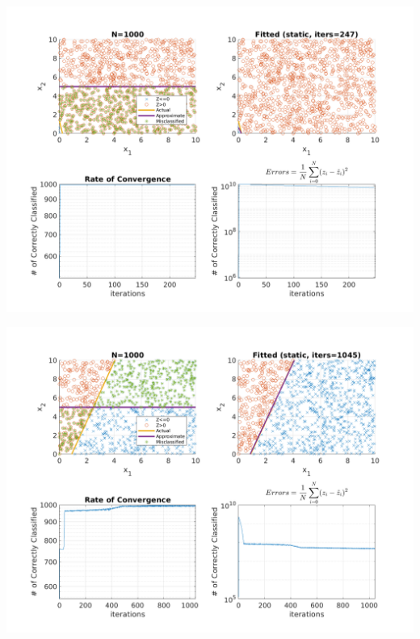 \documentclass{article}
\newenvironment{Figure}
  {\par\medskip\noindent\minipage{\linewidth}}
  {\endminipage\par\medskip}
\begin{document}
\begin{multicols}{2}
\begin{Figure}
\end{Figure}
\begin{Figure}
\centering
\includegraphics[width=\linewidth]{pngs/n1000_static4.png}
\end{Figure}
\begin{Figure}
\centering
\includegraphics[width=\linewidth]{pngs/n1000_static5.png}
\end{Figure}


\end{multicols}
\end{document}
